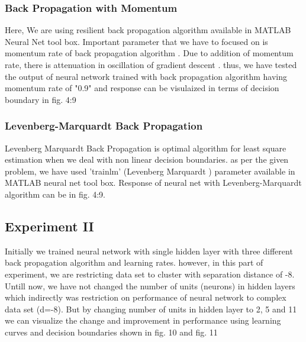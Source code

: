 \documentclass[conference]{IEEEtran}
\begin{document}
\subsubsection{Back Propagation with Momentum}
Here, We are using resilient back propagation algorithm available in MATLAB Neural Net tool box. Important parameter that we have to focused on is momentum rate of back propagation algorithm\cite{gdm} \cite{mgdm}. Due to addition of momentum rate, there is attenuation in oscillation of gradient descent \cite{gdm} . thus, we have tested the output of neural network trained with back propagation algorithm having momentum rate of "0.9" and response can be visulaized in terms of decision boundary in fig. 4:9\\
\subsubsection{Levenberg-Marquardt Back Propagation}
Levenberg Marquardt Back Propagation is optimal algorithm for least square estimation when we deal with non linear decision boundaries\cite{lm}. as per the given problem, we have used 'trainlm' (Levenberg Marquardt ) \cite{mlm} parameter available in MATLAB neural net tool box. Response of neural net with  Levenberg-Marquardt algorithm can be in fig. 4:9.

\subsection{Experiment II}
{ Initially we trained neural network with single hidden layer with three different back propagation algorithm and learning rates. however, in this part of experiment, we are restricting data set to cluster with separation distance of -8. Untill now, we have not changed the number of units (neurons) in hidden layers which indirectly was restriction on performance of neural network to complex data set (d=-8). But by changing  number of  units in hidden layer to 2, 5 and 11 we can visualize the change and improvement in performance using learning curves and decision boundaries shown in fig. 10 and fig. 11   }
\FloatBarrier
\end{document}
